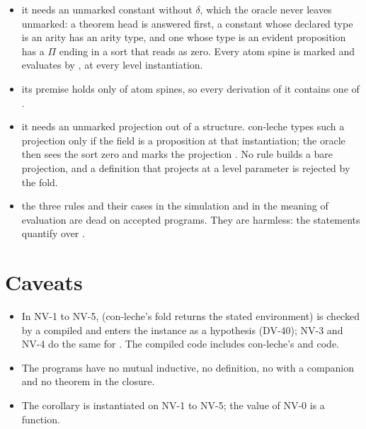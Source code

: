 \begin{itemize}
\item {} it needs an unmarked constant without $\delta$, which the oracle never leaves unmarked: a theorem head is answered  first, a constant whose declared type is an arity has an arity type, and one whose type is an evident proposition has a $\Pi$ ending in a sort that  reads as zero. Every atom spine is marked  and evaluates by , at every level instantiation.
\item {} its premise holds only of atom spines, so every derivation of it contains one of .
\item {} it needs an unmarked projection out of a  structure. con-leche types such a projection only if the field is a proposition at that instantiation; the oracle then sees the sort zero and marks the projection . No rule builds a bare projection, and a definition that projects at a level parameter is rejected by the fold.
\item {} the three rules and their cases in the simulation and in the meaning of evaluation are dead on accepted programs. They are harmless: the statements quantify over .
\end{itemize}

\section*{Caveats}
\begin{itemize}
\item In NV-1 to NV-5,  (con-leche's fold returns the stated environment) is checked by a compiled  and enters the instance as a hypothesis (DV-40); NV-3 and NV-4 do the same for . The compiled code includes con-leche's  and  code.
\item The programs have no mutual inductive, no  definition, no  with a companion and no theorem in the closure.
\item The corollary is instantiated on NV-1 to NV-5; the value of NV-0 is a function.
\end{itemize}
